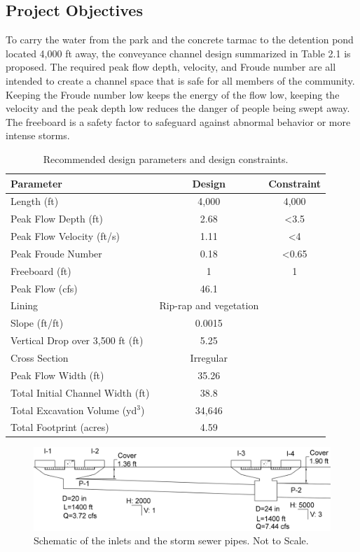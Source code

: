 \documentclass[11pt,letterpaper,final]{report}
\begin{document}
\begin{flushleft}
\setcounter{figure}{0}
\setcounter{section}{0} 
\chapter{Project Objectives}
To carry the water from the park and the concrete tarmac to the detention pond located 4,000 ft away, the conveyance channel design summarized in Table 2.1 is proposed. The required peak flow depth, velocity, and Froude number are all intended to create a channel space that is safe for all members of the community. Keeping the Froude number low keeps the energy of the flow low, keeping the velocity and the peak depth low reduces the danger of people being swept away. The freeboard is a safety factor to safeguard against abnormal behavior or more intense storms.
\begin{table}[htbp]
    \centering
    \caption{Recommended design parameters and design constraints.}
    \begin{tabular}{lcc}
    \textbf{Parameter}& \textbf{Design} & \textbf{Constraint}\\
    \hline
    Length (ft) & 4,000 &4,000   \\
    Peak Flow Depth (ft)  & 2.68 &<3.5\\
    Peak Flow Velocity (ft/s) & 1.11 & <4\\
    Peak Froude Number & 0.18 & <0.65\\
    Freeboard (ft) & 1  & 1 \\
    Peak Flow (cfs) & 46.1 & \\
    Lining & Rip-rap and vegetation &  \\
    Slope (ft/ft) & 0.0015 & \\
    Vertical Drop over 3,500 ft (ft)& 5.25 & \\
    Cross Section & Irregular &  \\
    Peak Flow Width (ft) & 35.26 & \\
    Total Initial Channel Width (ft) & 38.8\\ 
    Total Excavation Volume (yd$^3$) & 34,646 \\
    Total Footprint (acres) & 4.59 \\ \hline
    \end{tabular} 
    \end{table}

    \begin{figure}[H]
        \centering
        \includegraphics[width=\textwidth]{F1ss2}
        \caption{Schematic of the inlets and the storm sewer pipes. Not to Scale.}
    \end{figure}


\end{flushleft}
\end{document}
